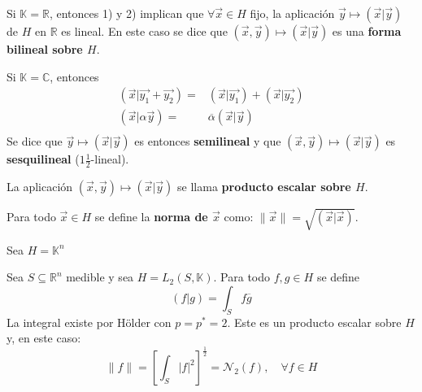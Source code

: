 \documentclass[12pt]{report}
\theoremstyle{largebreak}
\newcommand\norm[1]{\ensuremath{\|#1\|}}
\newcommand\ora[1]{\ensuremath{\vec{#1}}}
\newcommand\pint[2]{\ensuremath{\left(#1\big| #2\right)}}
\newcommand\conj[1]{\ensuremath{\overline{#1}}}
\begin{document}
    \begin{obs}
        Si $\mathbb{K}=\mathbb{R}$, entonces 1) y 2) implican que $\forall \ora{x}\in H$ fijo, la aplicación $\ora{y}\mapsto\pint{\ora{x}}{\ora{y}}$ de $H$ en $\mathbb{R}$ es lineal. En este caso se dice que $(\ora{x},\ora{y})\mapsto\pint{\ora{x}}{\ora{y}}$ es una \textbf{forma bilineal sobre $H$}.

        Si $\mathbb{K}=\mathbb{C}$, entonces
        \begin{equation*}
            \begin{split}
                \pint{\ora{x}}{\ora{y_1}+\ora{y_2}}=&\pint{\ora{x}}{\ora{y_1}}+\pint{\ora{x}}{\ora{y_2}}\\
                \pint{\ora{x}}{\alpha\ora{y}}=&\conj{\alpha}\pint{\ora{x}}{\ora{y}}\\
            \end{split}
        \end{equation*}
        Se dice que $\ora{y}\mapsto\pint{\ora{x}}{\ora{y}}$ es entonces \textbf{semilineal} y que $(\ora{x},\ora{y})\mapsto\pint{\ora{x}}{\ora{y}}$ es \textbf{sesquilineal} ($1\frac{1}{2}$-lineal).

        La aplicación $(\ora{x},\ora{y})\mapsto\pint{\ora{x}}{\ora{y}}$ se llama \textbf{producto escalar sobre $H$}.
    \end{obs}

    \begin{mydef}
        Para todo $\ora{x}\in H$ se define la \textbf{norma de $\ora{x}$} como: $\norm{\ora{x}}=\sqrt{\pint{\ora{x}}{\ora{x}}}$.
    \end{mydef}

    \begin{exa}
        Sea $H=\mathbb{K}^n$
    \end{exa}

    \begin{exa}
        Sea $S\subseteq\mathbb{R}^n$ medible y sea $H=L_2(S,\mathbb{K})$. Para todo $f,g\in H$ se define
        \begin{equation*}
            \pint{f}{g}=\int_Sf\conj{g}
        \end{equation*}
        La integral existe por Hölder con $p=p^*=2$. Este es un producto escalar sobre $H$ y, en este caso:
        \begin{equation*}
            \norm{f}=\left[\int_S\big|f\big|^2 \right]^{\frac{1}{2}}=\mathcal{N}_2(f),\quad \forall f\in H
        \end{equation*}
    \end{exa}
\end{document}
